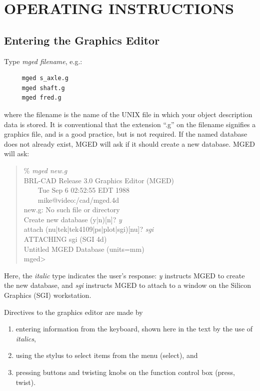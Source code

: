 \chapter{OPERATING INSTRUCTIONS}

\section{Entering the Graphics Editor}

Type {\em mged filename}, e.g.:
\begin{verbatim}
     mged s_axle.g
     mged shaft.g
     mged fred.g
\end{verbatim}
where the filename is the name of the UNIX file in which
your object description data is stored.
It is conventional that the
extension ``.g'' on the filename
signifies a graphics file, and is a good practice, but is not required.
If the named database does not already exist,
MGED will ask if it should create a new database.
MGED will ask:

{\tt \begin{verse}
\% {\em mged new.g} \\
BRL-CAD Release 3.0 Graphics Editor (MGED) \\
\ \ \ \ Tue Sep 6 02:52:55 EDT 1988 \\
\ \ \ \ mike@video:/cad/mged.4d \\
new.g: No such file or directory \\
Create new database (y|n)[n]? {\em y} \\
attach (nu|tek|tek4109|ps|plot|sgi)[nu]? {\em sgi} \\
ATTACHING sgi (SGI 4d) \\
Untitled MGED Database (units=mm) \\
mged>
\end{verse} }
Here, the {\em italic} type indicates the user's response:
{\em y} instructs MGED to create the new database, and
{\em sgi} instructs MGED to attach to a window
on the Silicon Graphics (SGI) workstation.

Directives to the graphics editor are made by
\begin{enumerate}
\item entering information from the keyboard,
shown here in the text by the use of {\em italics},
\item using the stylus to select items from
the menu (select), and
\item pressing buttons and twisting knobs on the
function control box (press, twist).
\end{enumerate}

